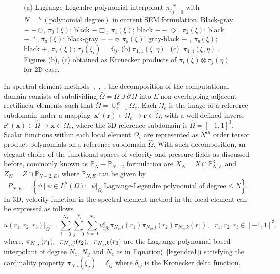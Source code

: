 \documentclass[times]{fldauth}
\begin{document}
\begin{figure}
\begin{subfigure}[b]{0.45\textwidth}
                 \caption{}
                 \label{fig:poly3}
         \end{subfigure}
        \caption{(a) Lagrange-Legendre polynomial interpolant ${\pi_j}_{j=0}^{N}$ with $N = 7\,(\mbox{polynomial degree})$ in current SEM formulation. Black-gray $--\ocircle$,   $\pi_0(\xi)$;  black $-\Box$,  $\pi_1(\xi)$;  black $--\Diamond$,  $\pi_2(\xi)$;  black $-.*$,  $\pi_3(\xi)$;  black-gray $--\davidsstar$  $\pi_5(\xi)$; gray-black $-$ ,  $\pi_6(\xi)$; black $+$, $\pi_7(\xi)$; $\pi_j(\xi_i) = \delta_{ij}$. (b)$\  \pi_{1,1}(\xi,\eta) \ \ $ (c) $\  \pi_{4,4}(\xi,\eta) \ $. Figures (b), (c) obtained as Kronecker products of $\pi_{i}(\xi)\otimes \pi_{j}(\eta)$ for 2D case.}\label{fig:figure_legpoly1}
\end{figure}

In spectral element methods~\cite{patera3},~\cite{deville},~\cite{fischer_jcp}, the decomposition of the computational domain consists of  subdividing $\bar{\Omega} = \Omega\cup \partial\, \Omega$ into $E$ non-overlapping adjacent rectilinear elements such that $\bar{\Omega} = \cup_{e=1}^{E}\Omega_{e}$. Each ${\Omega_{e}}$ is the image of a reference subdomain under a mapping\ ${\mathbf{x}}^{e}(\mathbf{r}) \in {\Omega_{e}} \rightarrow \mathbf{r}\in {\hat{\Omega}}$, with a well defined inverse  ${\mathbf{r}}^{e}(\mathbf{x}) \in \hat{{\Omega}} \rightarrow \mathbf{x}\in {\Omega_{e}}$, where the 3D reference subdomain is ${\hat{\Omega}} = [-1,1]^{3}$. Scalar functions within each local element ${{\Omega}_{e}}$ are represented as $N^{th}$ order tensor product polynomials on a reference subdomain ${\hat{\Omega}}$. With such decomposition, an elegant choice of the functional spaces of velocity and pressure fields as discussed before, commonly known as $\mathbb{P}_{N}-\mathbb{P}_{N-2}$ formulation are $X_N = X\cap \mathbb{P}_{N,E}^{3}$ and $Z_N = Z\cap \mathbb{P}_{N-2,E}$, where $\mathbb{P}_{N,E}$ can be given by
\begin{equation}
P_{N,E} = \left\{ \psi \ \Big|\ \psi \in L^2(\Omega); \:\:\psi|_{\Omega_e} \mbox{Lagrange-Legendre polynomial of degree} \leq N \right\}. \label{sob2}
\end{equation}
In 3D, velocity function in the spectral element method in the local element can be expressed as follows
\begin{equation}
u(r_1,r_2,r_3)|_{\hat{\Omega}} = \displaystyle\sum_{i=0}^{N_x}\sum_{j=0}^{N_y}\sum_{k=0}^{N_z}u_{ijk}^{e}\pi_{N_x,i}({r_1})\pi_{N_y,j}({r_2})\pi_{N_z,k}({r_3}),  \ \ \ {r_1},{r_2},{r_3}\in [-1,1]^3,
\end{equation}
where, $\pi_{N_x,i}(r_1),\hspace{0.5em} \pi_{N_y,j}(r_2), \hspace{0.5em}\pi_{N_z,k}(r_3)$ are the Lagrange polynomial based interpolant of degree $N_x$, $N_y$ and $N_z$ as in Equation(~\ref{legendre1}) satisfying the cardinality property $\pi_{N,i}(\xi_{j}) = \delta_{ij}$ where $\delta_{ij}$ is the Kronecker delta function.
 
\end{document}
